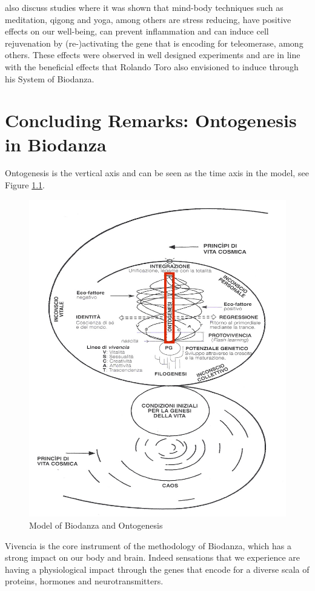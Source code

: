 \documentclass[
  11pt,
]{book}
\begin{document}
\citet{BlackburnEpel2017} also discuss studies where it was shown that mind-body techniques such as meditation, qigong and yoga, among others are stress reducing, have positive effects on our well-being, can prevent inflammation and can induce cell rejuvenation by (re-)activating the gene that is encoding for teleomerase, among others. These effects were observed in well designed experiments and are in line with the beneficial effects that Rolando Toro also envisioned to induce through his System of Biodanza.

\hypertarget{concluding-remarks-ontogenesis-in-biodanza}{%
\chapter{Concluding Remarks: Ontogenesis in Biodanza}\label{concluding-remarks-ontogenesis-in-biodanza}}

Ontogenesis is the vertical axis and can be seen as the time axis in the model, see Figure \ref{fig:modelOnto2}.

\begin{figure}

{\centering \includegraphics[width=0.5\linewidth]{./figs/biologischeAspectenBiodanzaDeelIII} 

}

\caption{Model of Biodanza and Ontogenesis}\label{fig:modelOnto2}
\end{figure}

Vivencia is the core instrument of the methodology of Biodanza, which has a strong impact on our body and brain. Indeed sensations that we experience are having a physiological impact through the genes that encode for a diverse scala of proteins, hormones and neurotransmitters.
\end{document}
